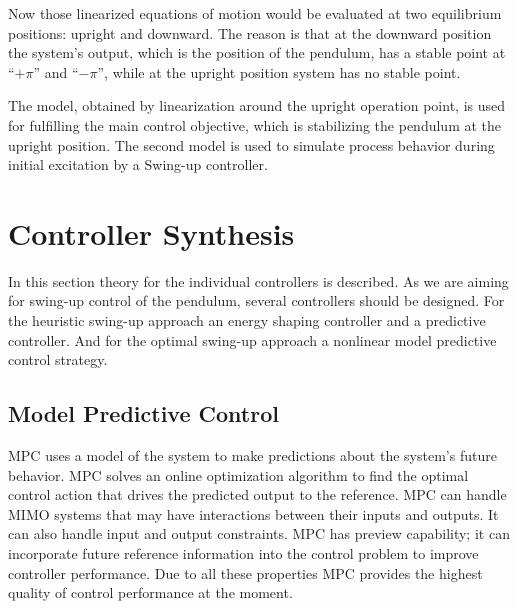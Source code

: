 Now those linearized equations of motion would be evaluated at two equilibrium positions: upright and downward. The reason is that at the downward position the system's output, which is the position of the pendulum, has a stable point at “$+\pi$” and “$-\pi$”, while at the upright position system has no stable point.
 
The model, obtained by linearization around the upright operation point, is used for fulfilling the main control objective, which is stabilizing the pendulum at the upright position. The second model is used to simulate process behavior during initial excitation by a Swing-up controller.
\section{Controller Synthesis}
In this section theory for the individual controllers is described. As we are aiming for swing-up control of the pendulum, several controllers should be designed. For the heuristic swing-up approach an energy shaping controller and a predictive controller. And for the optimal swing-up approach a nonlinear model predictive control strategy.
\subsection{Model Predictive Control}
MPC uses a model of the system to make predictions about the system’s future behavior. MPC solves an online optimization algorithm to find the optimal control action that drives the predicted output to the reference. MPC can handle MIMO systems that may have interactions between their inputs and outputs. It can also handle input and output constraints. MPC has preview capability; it can incorporate future reference information into the control problem to improve controller performance. Due to all these properties MPC provides the highest quality of control performance at the moment.
